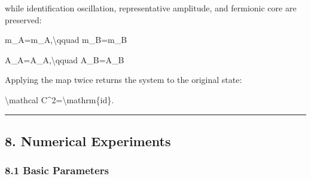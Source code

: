 \documentclass[
  a4paper,
]{article}
\newenvironment{Shaded}{}{}
\newcommand{\NormalTok}[1]{#1}
\begin{document}
while identification oscillation, representative amplitude, and
fermionic core are preserved:

\begin{Shaded}
\begin{Highlighting}[]
\NormalTok{m\_A\textquotesingle{}\textquotesingle{}=m\_A\textquotesingle{},\textbackslash{}qquad m\_B\textquotesingle{}\textquotesingle{}=m\_B\textquotesingle{}}
\end{Highlighting}
\end{Shaded}

\begin{Shaded}
\begin{Highlighting}[]
\NormalTok{A\_A\textquotesingle{}\textquotesingle{}=A\_A\textquotesingle{},\textbackslash{}qquad A\_B\textquotesingle{}\textquotesingle{}=A\_B\textquotesingle{}}
\end{Highlighting}
\end{Shaded}

Applying the map twice returns the system to the original state:

\begin{Shaded}
\begin{Highlighting}[]
\NormalTok{\textbackslash{}mathcal C\^{}2=\textbackslash{}mathrm\{id\}.}
\end{Highlighting}
\end{Shaded}

\begin{center}\rule{0.5\linewidth}{0.5pt}\end{center}

\subsection{8. Numerical Experiments}\label{numerical-experiments}

\subsubsection{8.1 Basic Parameters}\label{basic-parameters}
\end{document}
